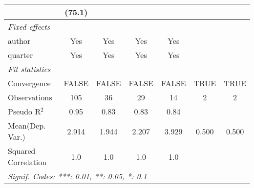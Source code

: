 \begin{tabular}{lcccccc}
                              & (75.1)        &              &              &              &      &   \\   
   \midrule
   \emph{Fixed-effects}\\
   author                     & Yes           & Yes          & Yes          & Yes          &      & \\  
   quarter                    & Yes           & Yes          & Yes          & Yes          &      & \\  
   \midrule
   \emph{Fit statistics}\\
   Convergence                &FALSE          & FALSE        & FALSE        & FALSE        & TRUE & TRUE\\  
   Observations               & 105           & 36           & 29           & 14           & 2    & 2\\  
   Pseudo R$^2$               & 0.95          & 0.83         & 0.83         & 0.84         &      & \\  
Mean(Dep. Var.) & 2.914 & 1.944 & 2.207 & 3.929 & 0.500 & 0.500 \\
   Squared Correlation        & 1.0           & 1.0          & 1.0          & 1.0          &      & \\  
   \midrule \midrule
   \multicolumn{7}{l}{\emph{Signif. Codes: ***: 0.01, **: 0.05, *: 0.1}}\\
\end{tabular}
\par\endgroup
